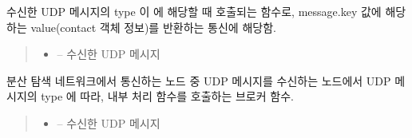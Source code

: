 \documentclass[a4paper,10pt,english]{sphinxmanual}
\begin{document}
\begin{fulllineitems}
\begin{fulllineitems}
\begin{quote}
\begin{description}
\begin{itemize}
\end{itemize}

\end{description}\end{quote}

\end{fulllineitems}


\begin{fulllineitems}
\label{\detokenize{_kademlia:KNode._onFindValue}}
\pysigstartsignatures
{}
\pysigstopsignatures
\sphinxAtStartPar
수신한 UDP 메시지의 type 이  에 해당할 때 호출되는 함수로,
message.key 값에 해당하는 value(contact 객체 정보)를 반환하는 통신에 해당함.
\begin{quote}\begin{description}
\begin{itemize}
\item {} 
\sphinxAtStartPar
{} – 수신한 UDP 메시지

\end{itemize}

\end{description}\end{quote}

\end{fulllineitems}


\begin{fulllineitems}
\label{\detokenize{_kademlia:KNode._onMessage}}
\pysigstartsignatures
{}
\pysigstopsignatures
\sphinxAtStartPar
분산 탐색 네트워크에서 통신하는 노드 중 UDP 메시지를 수신하는 노드에서 UDP 메시지의 type 에 따라,
내부 처리 함수를 호출하는 브로커 함수.
\begin{quote}\begin{description}
\begin{itemize}
\item {} 
\sphinxAtStartPar
{} – 수신한 UDP 메시지


\end{itemize}
\end{description}
\end{quote}
\end{fulllineitems}
\end{fulllineitems}
\end{document}

